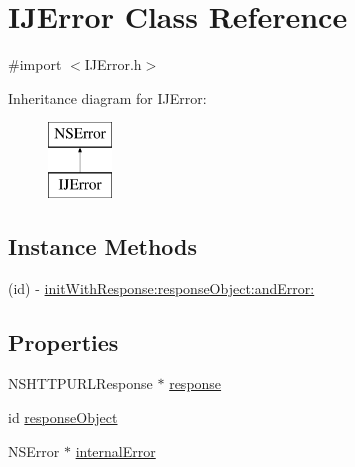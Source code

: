 \hypertarget{interface_i_j_error}{\section{I\+J\+Error Class Reference}
\label{interface_i_j_error}
}


{\ttfamily \#import $<$I\+J\+Error.\+h$>$}

Inheritance diagram for I\+J\+Error\+:\begin{figure}[H]
\begin{center}
\leavevmode
\includegraphics[height=2.000000cm]{interface_i_j_error}
\end{center}
\end{figure}
\subsection*{Instance Methods}
\begin{DoxyCompactItemize}
\item 
(id) -\/ \hyperlink{interface_i_j_error_a5629f8ba684d889b94903853ddeb53fa}{init\+With\+Response\+:response\+Object\+:and\+Error\+:}
\end{DoxyCompactItemize}
\subsection*{Properties}
\begin{DoxyCompactItemize}
\item 
N\+S\+H\+T\+T\+P\+U\+R\+L\+Response $\ast$ \hyperlink{interface_i_j_error_a44cfbf6891e5368a83d81407ac05ba4d}{response}
\item 
id \hyperlink{interface_i_j_error_ad9bbe1ee541238cfc14a42eb592260c6}{response\+Object}
\item 
N\+S\+Error $\ast$ \hyperlink{interface_i_j_error_a3ece78b392ee71d2f358312bff1bb75a}{internal\+Error}
\end{DoxyCompactItemize}


